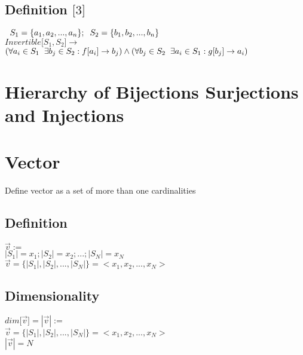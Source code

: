 \documentclass[11pt]{article}
\begin{document}
\subsection{Definition $\lbrack 3 \rbrack$}
\begin{center}
$\hspace{2mm} S_1 = \{a_1,a_2,...,a_n\}; \hspace{2mm} S_2 = \{b_1,b_2,...,b_n\}$
\\ \vspace{2mm}
$Invertible \lbrack S_1,S_2 \rbrack \rightarrow$
\\ \vspace{2mm}
$ (\forall a_i \in S_1 \hspace{2mm} \exists b_j \in S_2 : f \lbrack a_i \rbrack \rightarrow b_j) \land (\forall b_j \in S_2 \hspace{2mm} \exists a_i \in S_1 : g \lbrack b_j \rbrack \rightarrow a_i)$
\end{center}




\section{Hierarchy of Bijections Surjections and Injections}





\section{Vector}
Define vector as a set of more than one cardinalities

\subsection{Definition}
\begin{center}
$\vec{v} :=$
\\ \vspace{2mm}
$|S_1| = x_1; |S_2| = x_2;...;|S_N| = x_N$
\\ \vspace{2mm}
$\vec{v} = \{|S_1|,|S_2|,...,|S_N|\} = <x_1,x_2,...,x_N>$
\end{center}

\subsection{Dimensionality}
\begin{center}
$
dim \lbrack \vec{v} \rbrack = |\vec{v}| :=
$
\\ \vspace{2mm}
$
\vec{v} = \{|S_1|,|S_2|,...,|S_N|\} = <x_1,x_2,...,x_N>
$
\\ \vspace{2mm}
$
| \vec{v} | = N
$
\end{center}
\end{document}
